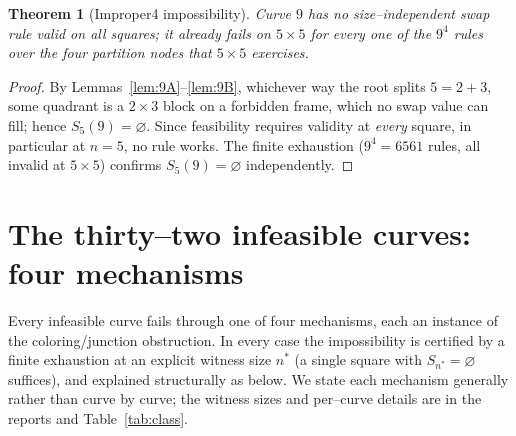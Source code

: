 \documentclass[11pt]{article}
\newtheorem{theorem}{Theorem}
\theoremstyle{definition}
\begin{document}
\begin{theorem}[Improper4 impossibility]\label{thm:9}
Curve $9$ has no size--independent swap rule valid on all squares; it already fails on
$5\times5$ for every one of the $9^4$ rules over the four partition nodes that $5\times5$
exercises.
\end{theorem}
\begin{proof}
By Lemmas~\ref{lem:9A}--\ref{lem:9B}, whichever way the root splits $5=2+3$, some quadrant
is a $2\times3$ block on a forbidden frame, which no swap value can fill; hence
$S_5(9)=\varnothing$. Since feasibility requires validity at \emph{every} square, in
particular at $n=5$, no rule works. The finite exhaustion ($9^4=6561$ rules, all invalid at
$5\times5$) confirms $S_5(9)=\varnothing$ independently.
\end{proof}

\section{The thirty--two infeasible curves: four mechanisms}\label{sec:mechanisms}

Every infeasible curve fails through one of four mechanisms, each an instance of the
coloring/junction obstruction. In every case the impossibility is certified by a finite
exhaustion at an explicit witness size $n^\ast$ (a single square with $S_{n^\ast}=\varnothing$
suffices), and explained structurally as below. We state each mechanism generally rather
than curve by curve; the witness sizes and per--curve details are in the reports and
Table~\ref{tab:class}.
\end{document}
